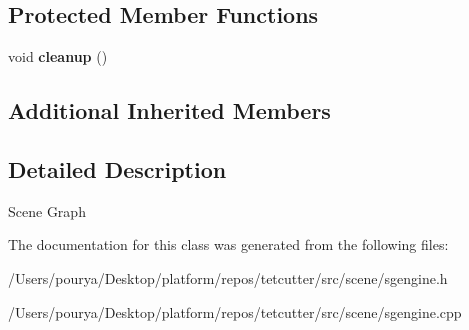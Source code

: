 \subsection*{Protected Member Functions}
\begin{DoxyCompactItemize}
\item 
\hypertarget{classps_1_1scene_1_1SGEngine_a4af4ea786996fff8b7e69a3272c4881e}{}void {\bfseries cleanup} ()\label{classps_1_1scene_1_1SGEngine_a4af4ea786996fff8b7e69a3272c4881e}

\end{DoxyCompactItemize}
\subsection*{Additional Inherited Members}


\subsection{Detailed Description}
Scene Graph 

The documentation for this class was generated from the following files\+:\begin{DoxyCompactItemize}
\item 
/\+Users/pourya/\+Desktop/platform/repos/tetcutter/src/scene/sgengine.\+h\item 
/\+Users/pourya/\+Desktop/platform/repos/tetcutter/src/scene/sgengine.\+cpp\end{DoxyCompactItemize}
